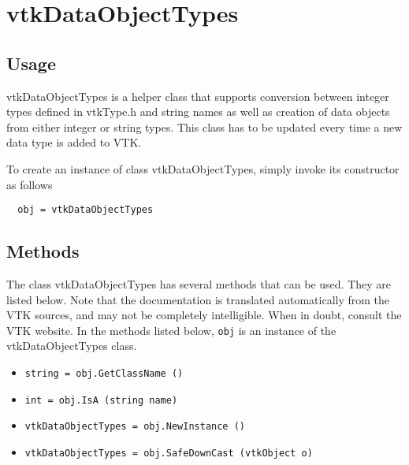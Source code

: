 \section{vtkDataObjectTypes}

\subsection{Usage}

 vtkDataObjectTypes is a helper class that supports conversion between
 integer types defined in vtkType.h and string names as well as creation
 of data objects from either integer or string types. This class has
 to be updated every time a new data type is added to VTK.

To create an instance of class vtkDataObjectTypes, simply
invoke its constructor as follows
\begin{verbatim}
  obj = vtkDataObjectTypes
\end{verbatim}
\subsection{Methods}

The class vtkDataObjectTypes has several methods that can be used.
  They are listed below.
Note that the documentation is translated automatically from the VTK sources,
and may not be completely intelligible.  When in doubt, consult the VTK website.
In the methods listed below, \verb|obj| is an instance of the vtkDataObjectTypes class.
\begin{itemize}
\item  \verb|string = obj.GetClassName ()|

\item  \verb|int = obj.IsA (string name)|

\item  \verb|vtkDataObjectTypes = obj.NewInstance ()|

\item  \verb|vtkDataObjectTypes = obj.SafeDownCast (vtkObject o)|

\end{itemize}
